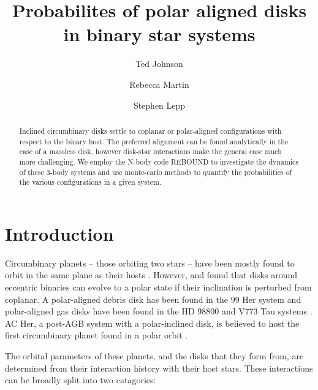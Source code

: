 \documentclass[twocolumn]{aastex631}
\begin{document}
\title{Probabilites of polar aligned disks in binary star systems}

\author{Ted Johnson}
\author{Rebecca Martin}
\author{Stephen Lepp}

\begin{abstract}
    Inclined circumbinary disks settle to coplanar or polar-aligned configurations with respect to the binary host.
    The preferred alignment can be found analytically
    in the case of a massless disk, however disk-star interactions make the general case much more challenging.
    We employ the N-body code REBOUND to investigate the dynamics of these 3-body systems and use monte-carlo methods
    to quantify the probabilities of the various configurations in a given system.
\end{abstract}

\section{Introduction}
\label{sec:intro}



Circumbinary planets -- those orbiting two stars -- have been mostly found to orbit in the same plane as
their hosts \citep{doyle2011,orosz2012,welsh2012}. However, \citet{aly2015} and \citet{martin2017} found that disks around eccentric binaries
can evolve to a polar state if their inclination is perturbed from coplanar. A polar-aligned debris disk has been found in the 99 Her system
\citep{kennedy2012} and polar-aligned gas disks have been found in the HD 98800 and V773 Tau systems \citep[respectively]{kennedy2019,kenworthy2022}.
AC Her, a post-AGB system with a polar-inclined
disk, is believed to host the first circumbinary planet found in a polar orbit \citep{martin2023}.


The orbital parameters of these planets, and the disks that they form from, are determined from their interaction history with their
host stars. These interactions can be broadly split into two catagories:
\end{document}
